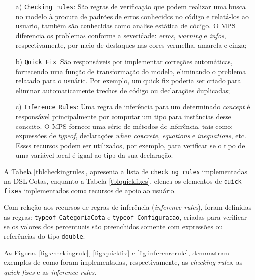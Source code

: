 \begin{enumerate}
 
 \item[a)] \texttt{Checking rules}: São regras de verificação que podem realizar uma busca no modelo à procura de padrões de erros conhecidos no código e relatá-los ao usuário, também são conhecidas como análise estática de código. O \gls{MPS} diferencia os problemas conforme a severidade: \textit{erros}, \textit{warning} e \textit{infos}, respectivamente, por meio de destaques nas cores vermelha, amarela e cinza;
 
 \item[b)]\texttt{Quick Fix}: São responsáveis por implementar correções automáticas, fornecendo uma função de transformação do modelo, eliminando o problema relatado para o usuário. Por exemplo, um quick fix poderia ser criado para eliminar automaticamente trechos de código ou declarações duplicadas;
 
 \item[c)]\texttt{Inference Rules}: Uma regra de inferência para um determinado \textit{concept} é responsável principalmente por computar um tipo para instâncias desse conceito. O \gls{MPS} fornece uma série de métodos de inferência, tais como: expressões de \textit{typeof}, declarações \textit{when concrete}, \textit{equations} e \textit{inequations}, etc. Esses recursos podem ser utilizados, por exemplo, para verificar se o tipo de uma variável local é igual ao tipo da sua declaração.
\end{enumerate}


A Tabela \ref{tblcheckingrules}, apresenta a lista de \texttt{checking rules} implementadas na DSL Cotas, enquanto a Tabela \ref{tblquickfixes}, elenca os elementos de \texttt{quick fixes} implementados como recursos de apoio ao usuário.

\newpage

\newpage



Com relação aos recursos de regras de inferência (\textit{inference rules}), foram definidas as regras: \texttt{typeof\_CategoriaCota} e \texttt{typeof\_Configuracao}, criadas para verificar se os valores dos percentuais são preenchidos somente com expressões ou referências do tipo \texttt{double}.

As Figuras \ref{fig:checkingrule}, \ref{fig:quickfix} e \ref{fig:inferencerule}, demonstram exemplos de como foram implementadas, respectivamente, as \textit{checking rules}, as \textit{quick fixes} e as \textit{inference rules}. 



